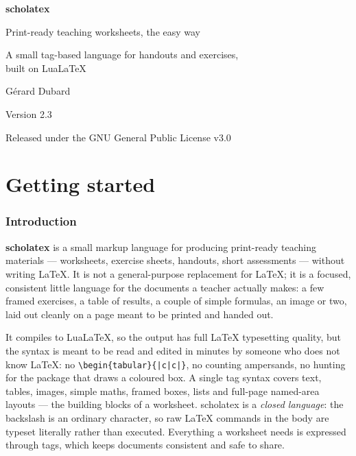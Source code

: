 \documentclass[11pt,a4paper]{article}
\newcommand{\tg}[1]{\texttt{#1}}
\begin{document}
\begin{titlepage}
\centering
\vspace*{3.5cm}
{\Huge\bfseries\color{Navy} scholatex\par}
\vspace{0.8cm}
{\Large Print-ready teaching worksheets, the easy way\par}
\vspace{2.5cm}
{\large A small tag-based language for handouts and exercises,\\[2pt]
built on LuaLaTeX\par}
\vspace{3cm}
{\large Gérard Dubard\par}
\vspace{0.4cm}
{\large Version 2.3\par}
\vfill
{\small Released under the GNU General Public License v3.0\par}
\end{titlepage}

\tableofcontents
\newpage

\part{Getting started}


\section{Introduction}

\textbf{scholatex} is a small markup language for producing print-ready
teaching materials --- worksheets, exercise sheets, handouts, short
assessments --- without writing LaTeX. It is not a general-purpose
replacement for LaTeX; it is a focused, consistent little language for the
documents a teacher actually makes: a few framed exercises, a table of
results, a couple of simple formulas, an image or two, laid out cleanly on
a page meant to be printed and handed out.

It compiles to LuaLaTeX, so the output has full LaTeX typesetting quality,
but the syntax is meant to be read and edited in minutes by someone who
does not know LaTeX: no \tg{\textbackslash begin\{tabular\}\{|c|c|\}}, no
counting ampersands, no hunting for the package that draws a coloured box. A
single tag syntax covers text, tables, images, simple maths, framed boxes,
lists and full-page named-area layouts --- the building blocks of a
worksheet. scholatex is a \emph{closed language}: the backslash is an
ordinary character, so raw LaTeX commands in the body are typeset literally
rather than executed. Everything a worksheet needs is expressed through tags,
which keeps documents consistent and safe to share.
\end{document}
